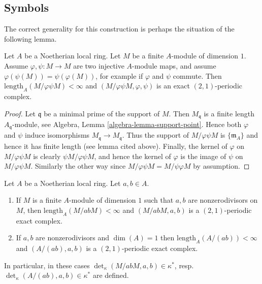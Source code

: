 \subsection{Symbols}
\label{subsection-symbols}

\noindent
The correct generality for this construction is perhaps the
situation of the following lemma.

\begin{lemma}
\label{lemma-pre-symbol}
Let $A$ be a Noetherian local ring.
Let $M$ be a finite $A$-module of dimension $1$.
Assume $\varphi, \psi : M \to M$ are two injective
$A$-module maps, and assume $\varphi(\psi(M)) = \psi(\varphi(M))$,
for example if $\varphi$ and $\psi$ commute.
Then $\text{length}_A(M/\varphi\psi M) < \infty$
and $(M/\varphi\psi M, \varphi, \psi)$ is an exact
$(2, 1)$-periodic complex.
\end{lemma}

\begin{proof}
Let $\mathfrak q$ be a minimal prime of the support of $M$.
Then $M_{\mathfrak q}$ is a finite length $A_{\mathfrak q}$-module,
see Algebra, Lemma \ref{algebra-lemma-support-point}.
Hence both $\varphi$ and $\psi$
induce isomorphisms $M_{\mathfrak q} \to M_{\mathfrak q}$.
Thus the support of $M/\varphi\psi M$ is $\{\mathfrak m_A\}$
and hence it has finite length (see lemma cited above).
Finally, the kernel of $\varphi$ on $M/\varphi\psi M$
is clearly $\psi M/\varphi\psi M$, and hence the kernel
of $\varphi$ is the image of $\psi$ on $M/\varphi\psi M$.
Similarly the other way since $M/\varphi\psi M = M/\psi\varphi M$
by assumption.
\end{proof}

\begin{lemma}
\label{lemma-symbol-defined}
Let $A$ be a Noetherian local ring. Let $a, b \in A$.
\begin{enumerate}
\item If $M$ is a finite $A$-module of dimension $1$
such that $a, b$ are nonzerodivisors on $M$, then
$\text{length}_A(M/abM) < \infty$ and
$(M/abM, a, b)$ is a $(2, 1)$-periodic exact complex.
\item If $a, b$ are nonzerodivisors and $\dim(A) = 1$
then $\text{length}_A(A/(ab)) < \infty$ and
$(A/(ab), a, b)$ is a $(2, 1)$-periodic exact complex.
\end{enumerate}
In particular, in these cases
$\det_\kappa(M/abM, a, b) \in \kappa^*$,
resp.\ $\det_\kappa(A/(ab), a, b) \in \kappa^*$
are defined.
\end{lemma}


